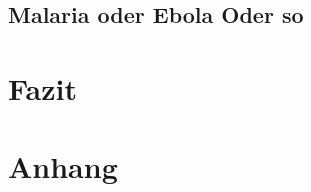 \documentclass[12pt]{scrartcl} %
\begin{document}
\subsection{Malaria oder Ebola Oder so}


\section{Fazit}


\newpage
\section{Anhang}


\newpage
\setlength{\bibitemsep}{\baselineskip}
\printbibliography[heading=bibintoc]
\end{document}
